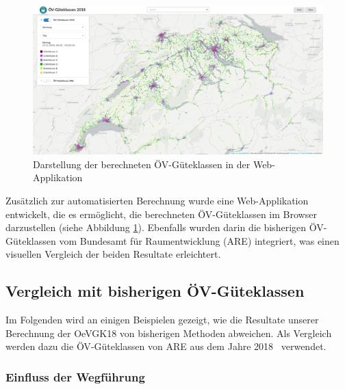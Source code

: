 \begin{landscape}
\begin{figure}[ht]
    \centering
    \includegraphics[width=1\linewidth]{technicalreport/img/resultat_oevgk18_uebersicht}
    \caption[Darstellung der berechneten ÖV-Güteklassen in der Web-Applikation]{Darstellung der berechneten ÖV-Güteklassen in der Web-Applikation}
    \label{fig:resultat_webapp_uebersicht}
\end{figure}
\end{landscape}

Zusätzlich zur automatisierten Berechnung wurde eine Web-Applikation entwickelt, die es ermöglicht, die berechneten \acs{ÖV}-Güteklassen im Browser darzustellen (siehe Abbildung \ref{fig:resultat_webapp_uebersicht}).
Ebenfalls wurden darin die bisherigen \acs{ÖV}-Güteklassen vom Bundesamt für Raumentwicklung (\acs{ARE}) integriert, was einen visuellen Vergleich der beiden Resultate erleichtert.

\subsection{Vergleich mit bisherigen ÖV-Güteklassen}
\label{Resultate:Vergleich mit bisherigen ÖV-Güteklassen}

Im Folgenden wird an einigen Beispielen gezeigt, wie die Resultate unserer Berechnung der \gls{OeVGK18} von bisherigen Methoden abweichen.
Als Vergleich werden dazu die \acs{ÖV}-Güteklassen von \ac{ARE} aus dem Jahre 2018~\cite{berechnung_are} verwendet.

\subsubsection{Einfluss der Wegführung}

